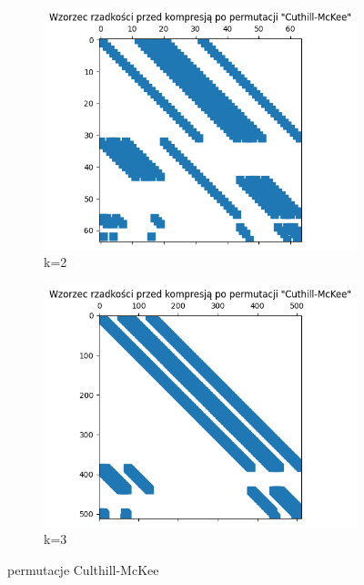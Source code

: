 \documentclass{article}
\begin{document}
\begin{figure}[htbp]
  \centering
  \begin{subfigure}[b]{0.4\textwidth}
      \includegraphics[width=\linewidth]{img/2c2k2.png}
      \caption{k=2}
      \label{fig:obraz1}
  \end{subfigure}
  \hfill
  \begin{subfigure}[b]{0.4\textwidth}
      \includegraphics[width=\linewidth]{img/2c2k3.png}
      \caption{k=3}
      \label{fig:obraz2}
  \end{subfigure}
  \caption{permutacje Culthill-McKee}
  \label{fig:zestaw_obrazkow}
\end{figure}
\FloatBarrier
\end{document}
